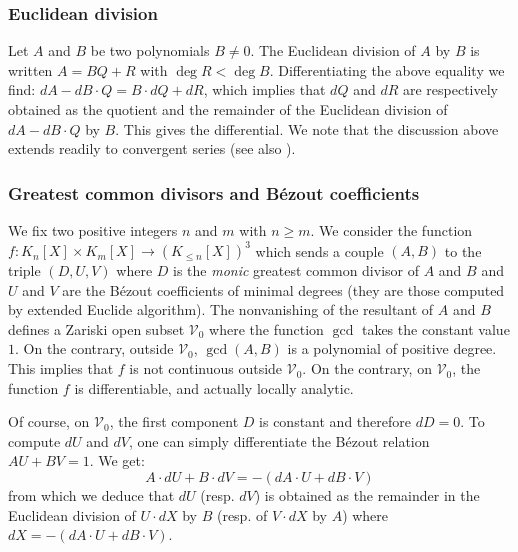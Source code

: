 \documentclass{lms}
\begin{document}
\subsubsection*{Euclidean division}

Let $A$ and $B$ be two polynomials $B \neq 0$. The Euclidean division of 
$A$ by $B$ is written $A = BQ + R$ with $\deg R < \deg B$. 
Differentiating the above equality we find:
$dA - dB \cdot Q = B \cdot dQ + dR$,
which implies that $dQ$ and $dR$ are respectively obtained as the 
quotient and the remainder of the Euclidean division of $dA - dB \cdot 
Q$ by $B$. This gives the differential. We note that the discussion 
above extends readily to convergent series (see also 
\cite{Caruso-Lubicz}).

\subsubsection*{Greatest common divisors and B\'ezout coefficients}

We fix two positive integers $n$ and $m$ with $n \geq m$. We consider the 
function $f : K_n[X] \times K_m[X] \to (K_{\leq n}[X])^3$ which sends a 
couple $(A,B)$ to the triple $(D, U, V)$ where $D$ is the \emph{monic} 
greatest common divisor of $A$ and $B$ and $U$ and $V$ are the B\'ezout 
coefficients of minimal degrees (they are those computed by extended 
Euclide algorithm).
The nonvanishing of the resultant of $A$ and $B$ defines a Zariski open 
subset $\mathcal V_0$ where the function $\gcd$ takes the constant value 
$1$. On the contrary, outside $\mathcal V_0$, $\gcd(A,B)$ is a polynomial 
of positive degree. This implies that $f$ is not continuous outside 
$\mathcal V_0$. On the contrary, on $\mathcal V_0$, the function $f$ is
differentiable, and actually locally analytic.

Of course, on $\mathcal V_0$, the first component $D$ is constant and 
therefore $dD = 0$. To compute $dU$ and $dV$, one can simply 
differentiate the B\'ezout relation $AU + BV = 1$. We get:
$$A \cdot dU + B \cdot dV = - (dA \cdot U + dB \cdot V)$$
from which we deduce that $dU$ (resp. $dV$) is obtained as the 
remainder in the Euclidean division of $U{\cdot}dX$ by $B$ (resp. of 
$V{\cdot}dX$ by $A$) where $dX = - (dA \cdot U + dB \cdot V)$.
\end{document}
